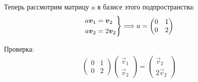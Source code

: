 \begin{solution}
    Теперь рассмотрим матрицу $a$ в базисе этого подпространства:
    \begin{gather}
        \begin{rcases}
            a\vec{v}_1 = \vec{v}_2 \\
            a\vec{v}_2 = 2\vec{v}_2 
        \end{rcases} \Longrightarrow a =
        \begin{pmatrix}
            0 & 1 \\
            0 & 2
        \end{pmatrix}
    \end{gather}

    Проверка:
    \begin{eqnarray}
        \begin{pmatrix}
            0 & 1 \\ 0 & 2
        \end{pmatrix}
        \begin{pmatrix}
            \vec{v}_1 \\ \vec{v}_2
        \end{pmatrix} = 
        \begin{pmatrix}
            \vec{v}_2 \\ 2\vec{v}_2
        \end{pmatrix}
    \end{eqnarray}
\end{solution}